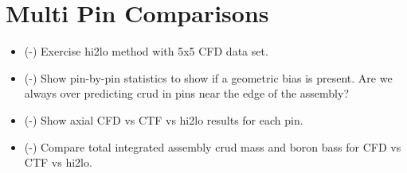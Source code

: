 \section{Multi Pin Comparisons}

\begin{itemize}
    \item (\checkmark-) Exercise hi2lo method with 5x5 CFD data set.
    \item (\checkmark-) Show pin-by-pin statistics to show if a geometric bias is present.  Are we always over predicting crud
    in pins near the edge of the assembly?
    \item (\checkmark-) Show axial CFD vs CTF vs hi2lo results for each pin.
    \item (\checkmark-) Compare total integrated assembly crud mass and boron bass for CFD vs CTF vs hi2lo.
\end{itemize}

